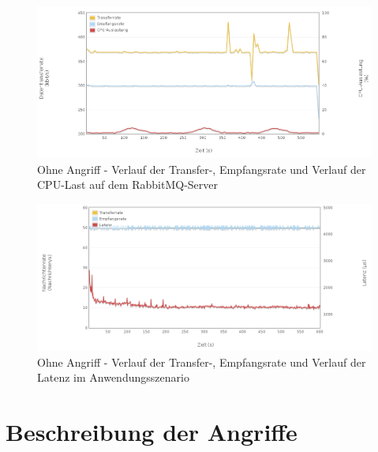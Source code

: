 \documentclass[	a4paper,
			11pt,
			oneside,
			parskip]{scrartcl}
\begin{document}
		\begin{figure}[!htb]
			\centering
			\includegraphics[width=\textwidth]{img/std/std_server2.png}
			\caption{Ohne Angriff - Verlauf der Transfer-, Empfangsrate und Verlauf der CPU-Last auf dem RabbitMQ-Server}
			\label{fig:std-server2}
		\end{figure}
		
		\begin{figure}[!htb]
			\centering
			\includegraphics[width=\textwidth]{img/std/std_scenario.png}
			\caption{Ohne Angriff - Verlauf der Transfer-, Empfangsrate und Verlauf der Latenz im Anwendungsszenario}
			\label{fig:std-scenario}
		\end{figure}
	


%	
%
\clearpage
\section*{Beschreibung der Angriffe}
\end{document}
